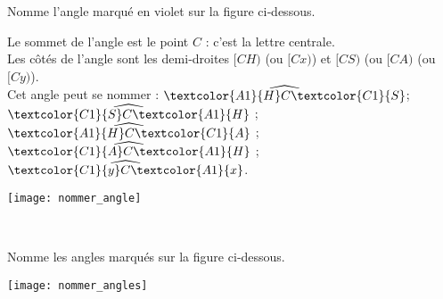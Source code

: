 
\begin{methode*1}

\begin{exemple*1}
Nomme l'angle marqué en violet sur la figure ci‑dessous.  \\[0.75em]

\begin{minipage}[c]{0.70\textwidth}
Le sommet de l'angle est le point $C$ : c'est la lettre centrale. \\[0.5em]
Les côtés de l'angle sont les demi‑droites $[CH)$ (ou $[Cx)$) et $[CS)$ (ou $[CA)$ (ou $[Cy)$). \\[0.5em]
Cet angle peut se nommer : $\widehat{{\textcolor{A1}{H}}C{\textcolor{C1}{S}}}$; $\widehat{{\textcolor{C1}{S}}C{\textcolor{A1}{H}}}$ ; $\widehat{{\textcolor{A1}{H}}C{\textcolor{C1}{A}}}$ ; $\widehat{{\textcolor{C1}{A}}C{\textcolor{A1}{H}}}$ ; $\widehat{{\textcolor{C1}{y}}C{\textcolor{A1}{x}}}$.
 \end{minipage} \hfill%
 \begin{minipage}[c]{0.26\textwidth}
 \texttt{[image: nommer\_angle]}
 \end{minipage} \\
 
\end{exemple*1}

\exercice 
Nomme les angles marqués sur la figure ci‑dessous. 
\begin{center} \texttt{[image: nommer\_angles]} \end{center}
 
\end{methode*1}



